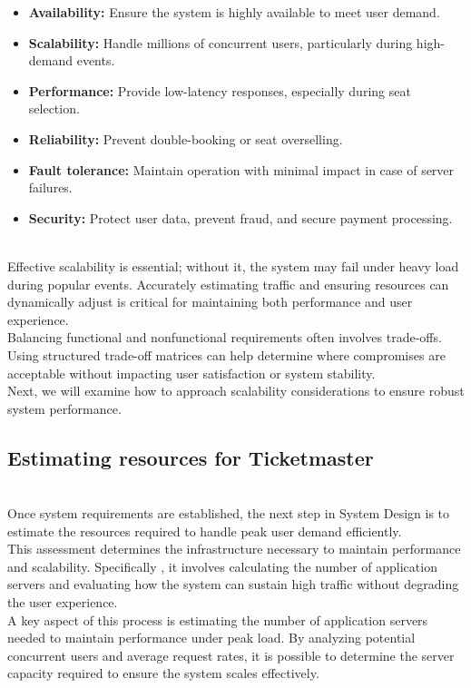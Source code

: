 \begin{itemize}
\item
\protect{}\label{Rz_mTNSlv8ftHiXOfhCxY}
\textbf{Availability:} Ensure the system is highly available to meet user demand.
\item
\protect{}\label{W4_1UH9Wr62hO4X7sUA7R}
\textbf{Scalability:} Handle millions of concurrent users, particularly during high-demand events.
\item
\protect{}\label{pE8Nhh8zEFkyFTgN5qgtS}
\textbf{Performance:} Provide low-latency responses, especially during seat selection.
\item
\protect{}\label{Y3Ucf3ct-KmSvqXM0VOaR}
\textbf{Reliability:} Prevent double-booking or seat overselling.
\item
\protect{}\label{TfO1gyNO8zYb1cnph3fAH}
\textbf{Fault tolerance:} Maintain operation with minimal impact in case of server failures.
\item
\protect{}\label{0u6QUpl0wJXovDszfhLrz}
\textbf{Security:} Protect user data, prevent fraud, and secure payment processing.
\end{itemize}
\\
Effective scalability is essential; without it, the system may fail under heavy load during popular events. Accurately estimating traffic and ensuring resources can dynamically adjust is critical for maintaining both performance and user experience.
\\
Balancing functional and nonfunctional requirements often involves trade-offs. Using structured trade-off matrices can help determine where compromises are acceptable without impacting user satisfaction or system stability.
\\
Next, we will examine how to approach scalability considerations to ensure robust system performance.

\subsection{Estimating resources for Ticketmaster}\label{HgnUfydOm6O-FwDOV94BR}
\\
Once system requirements are established, the next step in System Design is to estimate the resources required to handle peak user demand efficiently.
\\
This assessment determines the infrastructure necessary to maintain performance and scalability. Specifically , it involves calculating the number of application servers and evaluating how the system can sustain high traffic without degrading the user experience.
\\
A key aspect of this process is estimating the number of application servers needed to maintain performance under peak load. By analyzing potential concurrent users and average request rates, it is possible to determine the server capacity required to ensure the system scales effectively.

